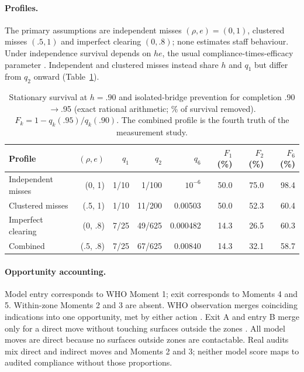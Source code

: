 \documentclass[11pt]{article}
\begin{document}
\paragraph{Profiles.} The primary assumptions are independent misses
$(\rho,e)=(0,1)$, clustered misses $(.5,1)$ and imperfect clearing $(0,.8)$;
none estimates staff behaviour. Under independence survival depends on $he$,
the usual compliance-times-efficacy parameter \citep{austin1999,beggs2009}.
Independent and clustered misses instead share $h$ and $q_1$ but differ from
$q_2$ onward (Table~\ref{tab:qtable}).

\begin{table}[htbp]\centering\footnotesize
\caption{Stationary survival at $h=.90$ and isolated-bridge prevention for completion .90$\to$.95 (exact rational arithmetic; \% of survival removed). $F_k=1-q_k(.95)/q_k(.90)$. The combined profile is the fourth truth of the measurement study.}\label{tab:qtable}
\begin{tabular}{lrrrrrrr}\toprule
Profile & $(\rho,e)$ & $q_1$ & $q_2$ & $q_6$ & $F_1$ (\%) & $F_2$ (\%) & $F_6$ (\%)\\\midrule
Independent misses & (0, 1) & 1/10 & 1/100 & $10^{-6}$ & 50.0 & 75.0 & 98.4\\
Clustered misses & (.5, 1) & 1/10 & 11/200 & 0.00503 & 50.0 & 52.3 & 60.4\\
Imperfect clearing & (0, .8) & 7/25 & 49/625 & 0.000482 & 14.3 & 26.5 & 60.3\\
Combined & (.5, .8) & 7/25 & 67/625 & 0.00840 & 14.3 & 32.1 & 58.7\\
\bottomrule\end{tabular}
\end{table}

\paragraph{Opportunity accounting.} Model entry corresponds to WHO Moment 1;
exit corresponds to Moments 4 and 5. Within-zone Moments 2 and 3 are absent.
WHO observation merges coinciding indications into one opportunity, met by
either action \citep[Sections II.5.6 and III.5]{who2009}. Exit A and entry B
merge only for a direct move without touching surfaces outside the zones
\citep[Part I, Section 21.4.2, p.~102]{whoguidelines2009}. All model moves are
direct because no surfaces outside zones are contactable. Real audits mix direct
and indirect moves and Moments 2 and 3; neither model score maps to audited
compliance without those proportions.
\end{document}
